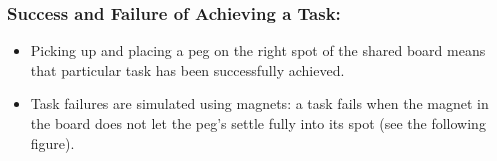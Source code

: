 \documentclass[12pt]{report}
\begin{document}
\begin{appendices}
\subsubsection{Success and Failure of Achieving a Task:}
\begin{itemize}
  \item Picking up and placing a peg on the right spot of the shared board means
  that particular task has been successfully achieved.
  \item Task failures are simulated using magnets: a task fails when the magnet
  in the board does not let the peg's settle fully into its spot (see the
  following figure).
\end{itemize}

\begin{figure}[tbh]
    \centering
    \qquad
    \qquad
    \label{fig:peg-instruction}%
\end{figure}


\end{appendices}
\end{document}
